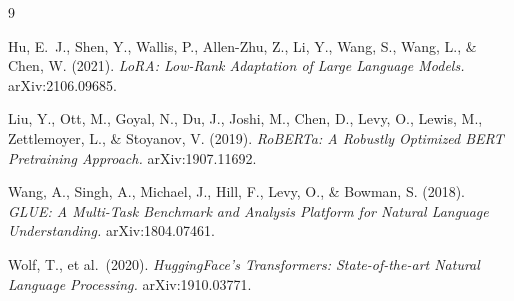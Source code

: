 \documentclass[11pt]{article}
\begin{document}
\begin{thebibliography}{9}

Hu, E.~J., Shen, Y., Wallis, P., Allen-Zhu, Z., Li, Y., Wang, S., Wang, L.,
\& Chen, W. (2021).
\textit{LoRA: Low-Rank Adaptation of Large Language Models.}
arXiv:2106.09685.

Liu, Y., Ott, M., Goyal, N., Du, J., Joshi, M., Chen, D., Levy, O.,
Lewis, M., Zettlemoyer, L., \& Stoyanov, V. (2019).
\textit{RoBERTa: A Robustly Optimized BERT Pretraining Approach.}
arXiv:1907.11692.

Wang, A., Singh, A., Michael, J., Hill, F., Levy, O., \& Bowman, S. (2018).
\textit{GLUE: A Multi-Task Benchmark and Analysis Platform for Natural Language
Understanding.}
arXiv:1804.07461.

Wolf, T., et al.\ (2020).
\textit{HuggingFace's Transformers: State-of-the-art Natural Language Processing.}
arXiv:1910.03771.

\end{thebibliography}
\end{document}
